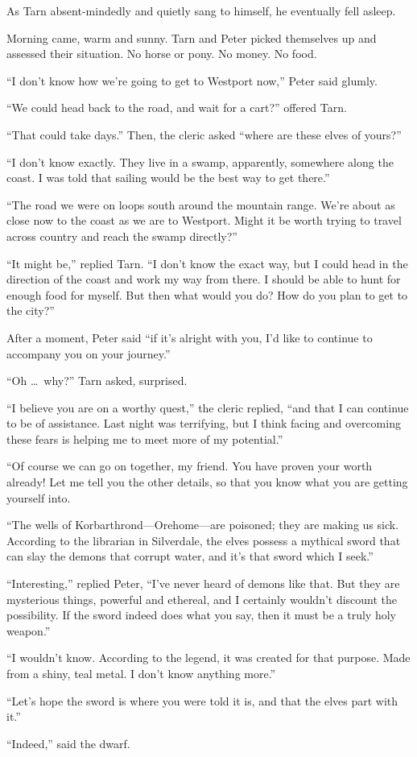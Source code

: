 As Tarn absent-mindedly and quietly sang to himself, he eventually fell asleep.

\divider

Morning came, warm and sunny.  Tarn and Peter picked themselves up and assessed their situation.  No horse or pony.  No money.  No food.

``I don't know how we're going to get to Westport now,'' Peter said glumly.

``We could head back to the road, and wait for a cart?'' offered Tarn.

``That could take days.''  Then, the cleric asked ``where are these elves of yours?''

``I don't know exactly.  They live in a swamp, apparently, somewhere along the coast.  I was told that sailing would be the best way to get there.''

``The road we were on loops south around the mountain range.  We're about as close now to the coast as we are to Westport.  Might it be worth trying to travel across country and reach the swamp directly?''

``It might be,'' replied Tarn.  ``I don't know the exact way, but I could head in the direction of the coast and work my way from there.  I should be able to hunt for enough food for myself.  But then what would you do?  How do you plan to get to the city?''

After a moment, Peter said ``if it's alright with you, I'd like to continue to accompany you on your journey.''

``Oh \ldots\ why?'' Tarn asked, surprised.

``I believe you are on a worthy quest,'' the cleric replied, ``and that I can continue to be of assistance.  Last night was terrifying, but I think facing and overcoming these fears is helping me to meet more of my potential.''

``Of course we can go on together, my friend.  You have proven your worth already!  Let me tell you the other details, so that you know what you are getting yourself into.

``The wells of Korbarthrond---Orehome---are poisoned; they are making us sick.  According to the librarian in Silverdale, the elves possess a mythical sword that can slay the demons that corrupt water, and it's that sword which I seek.''

``Interesting,'' replied Peter, ``I've never heard of demons like that.  But they are mysterious things, powerful and ethereal, and I certainly wouldn't discount the possibility.  If the sword indeed does what you say, then it must be a truly holy weapon.''

``I wouldn't know.  According to the legend, it was created for that purpose.  Made from a shiny, teal metal.  I don't know anything more.''

``Let's hope the sword is where you were told it is, and that the elves part with it.''

``Indeed,'' said the dwarf.